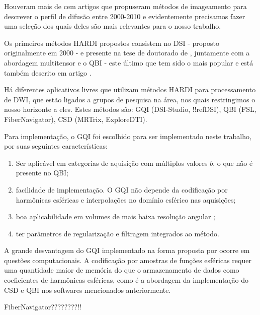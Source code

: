 \documentclass[
    12pt,                %
    oneside,            %
    a4paper,            %
    english,            %
    french,                %
    spanish,            %
    brazil                %
    ]{abntex2}
\begin{document}
Houveram mais de cem artigos que propuseram métodos de imageamento para descrever o perfil de difusão entre 2000-2010 \cite{descoteaux2015} e evidentemente precisamos fazer uma seleção dos quais deles são mais relevantes para o nosso trabalho.

Os primeiros métodos HARDI propostos consistem no DSI \cite{wedeen2005} - proposto originalmente em 2000 - e presente na tese de doutorado de , juntamente com a abordagem multitensor e o QBI - este último que tem sido o mais popular e está também descrito em artigo \cite{TuchQBall2004}.

Há diferentes aplicativos livres que utilizam métodos HARDI para processamento de DWI, que estão ligados a grupos de pesquisa na área, nos quais restringimos o nosso horizonte a eles. Estes métodos são: GQI (DSI-Studio, !!refDSI), QBI (FSL, FiberNavigator), CSD (MRTrix, ExploreDTI).

Para implementação, o GQI foi escolhido para ser implementado neste trabalho, por suas seguintes características:

\begin{enumerate}
    \item Ser aplicável em categorias de aquisição com múltiplos valores $b$, o que não é presente no QBI;
    \item facilidade de implementação. O GQI não depende da codificação por harmônicas esféricas e interpolações no domínio esférico nas aquisições;
    \item boa aplicabilidade em volumes de mais baixa resolução angular \cite{yeh2010};
    \item ter parâmetros de regularização e filtragem integrados ao método.
\end{enumerate}

A grande desvantagem do GQI implementado na forma proposta por  ocorre em questões computacionais. A codificação por amostras de funções esféricas requer uma quantidade maior de memória do que o armazenamento de dados como coeficientes de harmônicas esféricas, como é a abordagem da implementação do CSD e QBI nos softwares mencionados anteriormente.

FiberNavigator????????!!



\end{document}

